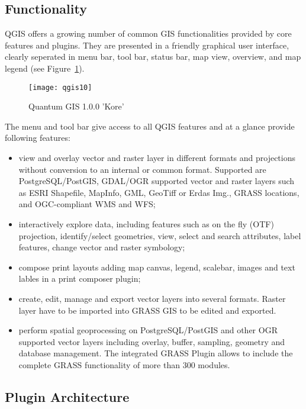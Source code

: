 \subsection{Functionality}

QGIS offers a growing number of common GIS functionalities provided by core
features and plugins. They are presented in a friendly graphical user
interface, clearly seperated in menu bar, tool bar, status bar, map view,
overview, and map legend (see Figure~\ref{fig:qgis10}).

\begin{figure}[h]
   \begin{center}
   \caption{Quantum GIS 1.0.0 'Kore'}\label{fig:qgis10}\smallskip
   \texttt{[image: qgis10]}
\end{center}
\end{figure}

The menu and tool bar give access to all QGIS features and at a glance
provide following features: 

\begin{itemize}
\item view and overlay vector and raster layer in different formats and
projections without conversion to an internal or common format. Supported are
PostgreSQL/PostGIS, GDAL/OGR supported vector and raster layers such as ESRI
Shapefile, MapInfo, GML, GeoTiff or Erdas Img., GRASS locations, and
OGC-compliant WMS and WFS;
\item interactively explore data, including features such as on the fly
(OTF) projection, identify/select geometries, view, select and search
attributes, label features, change vector and raster symbology; 
\item compose print layouts adding map canvas, legend, scalebar, images and
text lables in a print composer plugin;
\item create, edit, manage and export vector layers into several formats.
Raster layer have to be imported into GRASS GIS to be edited and
exported. 
\item perform spatial geoprocessing on PostgreSQL/PostGIS and other OGR
supported vector layers including overlay, buffer, sampling, geometry and
database management. The integrated GRASS Plugin allows to include the
complete GRASS functionality of more than 300 modules.
\end{itemize}

\subsection{Plugin Architecture}

